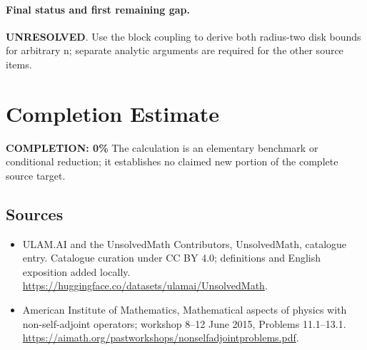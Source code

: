 \documentclass[11pt]{article}
\begin{document}
\paragraph{Final status and first remaining gap.}
\textbf{UNRESOLVED}. Use the block coupling to derive both radius-two disk bounds for arbitrary n; separate analytic arguments are required for the other source items.

\section{Completion Estimate}
\noindent\textbf{COMPLETION: 0\%}
The calculation is an elementary benchmark or conditional reduction; it establishes no claimed new portion of the complete source target.

\subsection{Sources}
\begin{itemize}
\item[\hypertarget{source:statement:1}{S1}] ULAM.AI and the UnsolvedMath Contributors, UnsolvedMath, catalogue entry. Catalogue curation under CC BY 4.0; definitions and English exposition added locally.
\url{https://huggingface.co/datasets/ulamai/UnsolvedMath}.
\item[\hypertarget{source:statement:2}{S2}] American Institute of Mathematics, Mathematical aspects of physics with non-self-adjoint operators; workshop 8–12 June 2015, Problems 11.1–13.1.
\url{https://aimath.org/pastworkshops/nonselfadjointproblems.pdf}.
\end{itemize}
\label{end:statement}
\end{document}

